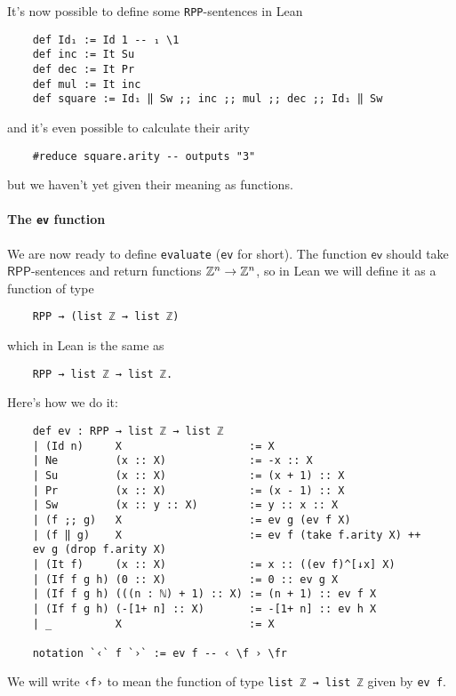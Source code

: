 \documentclass[runningheads]{llncs}
\newcommand{\RPP}{\textsf{RPP}\xspace}
\begin{document}
It's now possible to define some \lstinline{RPP}-sentences in Lean
\begin{lstlisting}
    def Id₁ := Id 1 -- ₁ \1
    def inc := It Su
    def dec := It Pr
    def mul := It inc
    def square := Id₁ ‖ Sw ;; inc ;; mul ;; dec ;; Id₁ ‖ Sw
\end{lstlisting}
and it's even possible to calculate their arity
\begin{lstlisting}
    #reduce square.arity -- outputs "3"
\end{lstlisting}
but we haven't yet given their meaning as functions.

\paragraph{The \lstinline{ev} function}
We are now ready to define \lstinline{evaluate} (\lstinline{ev} for short).
The function $\mathsf{ev}$ should take $\RPP$-sentences and return functions $\mathbb{Z}^n \to \mathbb{Z}^n$,
so in Lean we will define it as a function of type
\begin{lstlisting}
    RPP → (list ℤ → list ℤ)
\end{lstlisting}
which in Lean is the same as
\begin{lstlisting}
    RPP → list ℤ → list ℤ.
\end{lstlisting}
Here's how we do it:
\begin{lstlisting}
    def ev : RPP → list ℤ → list ℤ
    | (Id n)     X                    := X
    | Ne         (x :: X)             := -x :: X
    | Su         (x :: X)             := (x + 1) :: X
    | Pr         (x :: X)             := (x - 1) :: X
    | Sw         (x :: y :: X)        := y :: x :: X
    | (f ;; g)   X                    := ev g (ev f X)
    | (f ‖ g)    X                    := ev f (take f.arity X) ++
    ev g (drop f.arity X)
    | (It f)     (x :: X)             := x :: ((ev f)^[↓x] X)
    | (If f g h) (0 :: X)             := 0 :: ev g X
    | (If f g h) (((n : ℕ) + 1) :: X) := (n + 1) :: ev f X
    | (If f g h) (-[1+ n] :: X)       := -[1+ n] :: ev h X
    | _          X                    := X

    notation `‹` f `›` := ev f -- ‹ \f › \fr
\end{lstlisting}
We will write \lstinline{‹f›} to mean the function of type \lstinline{list ℤ → list ℤ} given by \lstinline{ev f}.
\end{document}

